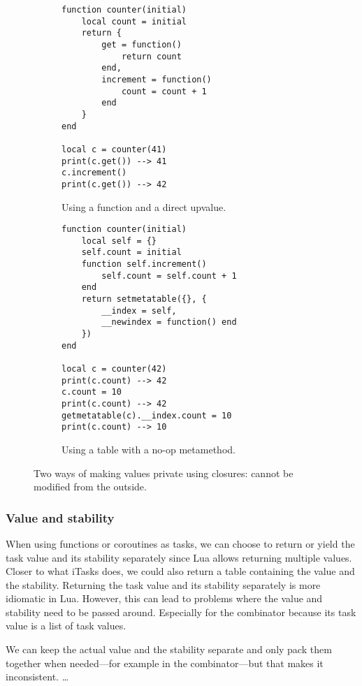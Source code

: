 \begin{figure}[ht]
\centering
\begin{subfigure}{0.40\textwidth}
\begin{verbatim}
function counter(initial)
    local count = initial
    return {
        get = function()
            return count
        end,
        increment = function()
            count = count + 1
        end
    }
end

local c = counter(41)
print(c.get()) --> 41
c.increment()
print(c.get()) --> 42
\end{verbatim}
\caption{Using a  function and a direct  upvalue.}
\label{lst:lua_private_a}
\end{subfigure}
\hspace{0.09\textwidth}
\begin{subfigure}{0.40\textwidth}
\begin{verbatim}
function counter(initial)
    local self = {}
    self.count = initial
    function self.increment()
        self.count = self.count + 1
    end
    return setmetatable({}, {
        __index = self,
        __newindex = function() end
    })
end

local c = counter(42)
print(c.count) --> 42
c.count = 10
print(c.count) --> 42
getmetatable(c).__index.count = 10
print(c.count) --> 10
\end{verbatim}
\caption{Using a table with a no-op  metamethod.}
\label{lst:lua_private_b}
\end{subfigure}
\caption{Two ways of making values private using closures:  cannot be modified from the outside.}
\label{lst:lua_private}
\end{figure}

\subsubsection{Value and stability}
When using functions or coroutines as tasks, we can choose to return or yield the task value and its stability separately since Lua allows returning multiple values. Closer to what iTasks does, we could also return a table containing the value and the stability. Returning the task value and its stability separately is more idiomatic in Lua. However, this can lead to problems where the value and stability need to be passed around. Especially for the  combinator because its task value is a list of task values.

We can keep the actual value and the stability separate and only pack them together when needed---for example in the  combinator---but that makes it inconsistent. \dots {}
